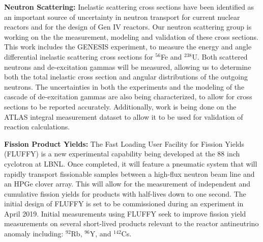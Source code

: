 \textbf{Neutron Scattering:}
Inelastic scattering cross sections have been identified as an important source of uncertainty in neutron transport for current nuclear reactors and for the design of Gen IV reactors. 
Our neutron scattering group is working on the the measurement, modeling and validation of these cross sections. 
This work includes the GENESIS experiment, to measure the energy and angle differential inelastic scattering cross sections for $^{56}$Fe and $^{238}$U. 
Both scattered neutrons and de-excitation gammas will be measured, allowing us to determine both the total inelastic cross section and angular distributions of the outgoing neutrons. 
The uncertainties in both the experiments and the modeling of the cascade of de-excitation gammas are also being characterized, to allow for cross sections to be reported accurately. 
Additionally, work is being done on the ATLAS integral measurement dataset to allow it to be used for validation of reaction calculations.

\textbf{Fission Product Yields:}
The Fast Loading User Facility for Fission Yields (FLUFFY) is a new experimental capability being developed at the 88 inch cyclotron at LBNL.
Once completed, it will feature a pneumatic system that will rapidly transport fissionable samples between a high-flux neutron beam line and an HPGe clover array. 
This will allow for the measurement of independent and cumulative fission yields for products with half-lives down to one second. 
The initial design of FLUFFY is set to be commissioned during an experiment in April 2019. 
Initial measurements using FLUFFY seek to improve fission yield measurements on several short-lived products relevant to the reactor antineutrino anomaly including: $^{92}$Rb, $^{96}$Y, and $^{142}$Cs. 




